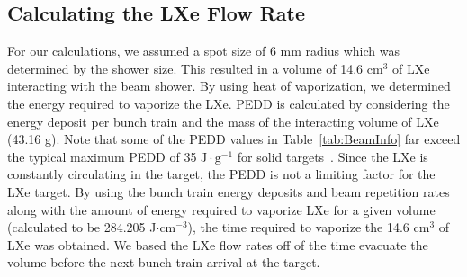 \documentclass[
reprint,
nofootinbib,
amsmath, amssymb,
aps,
floatfix,
]{revtex4-2}
\begin{document}
\subsection{Calculating the LXe Flow Rate} \label{sub:Flow}


For our calculations, we assumed a spot size of 6 mm 
radius which was determined by the shower size.  This resulted in a volume of 14.6 cm$^3$ of LXe interacting with the beam shower.
By using heat of vaporization, we determined the energy required to vaporize the LXe.
PEDD is calculated by considering the energy deposit per bunch train and the mass of the interacting volume of LXe (43.16 g).
Note that some of the PEDD values in Table~\ref{tab:BeamInfo} far exceed the typical maximum PEDD of 35 $\textrm{J}\cdot\textrm{g}^{-1}$ for solid targets~\cite{Seimiya2015}.
Since the LXe is constantly circulating in the target, the PEDD is not a limiting factor for the LXe target.
By using the bunch train energy deposits and beam repetition rates along with the amount of energy required to vaporize LXe for a given volume (calculated to be 284.205 J$\cdot \textrm{cm}^{-3}$),
the time required to vaporize the 14.6 cm$^3$ of LXe was obtained.
We based the LXe flow rates off of the time evacuate the volume before the next bunch train
arrival at the target.
\end{document}
